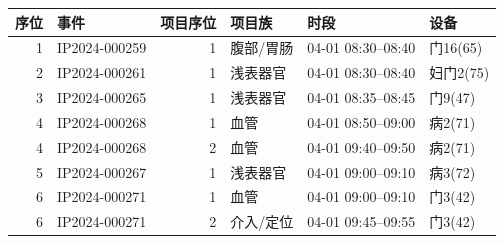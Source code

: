 \begin{tabularx}{\textwidth}{r l r X l l}
\toprule
序位 & 事件 & 项目序位 & 项目族 & 时段 & 设备 \\
\midrule
1 & IP2024-000259 & 1 & 腹部/胃肠 & 04-01 08:30--08:40 & 门16(65) \\
2 & IP2024-000261 & 1 & 浅表器官 & 04-01 08:30--08:40 & 妇门2(75) \\
3 & IP2024-000265 & 1 & 浅表器官 & 04-01 08:35--08:45 & 门9(47) \\
4 & IP2024-000268 & 1 & 血管 & 04-01 08:50--09:00 & 病2(71) \\
4 & IP2024-000268 & 2 & 血管 & 04-01 09:40--09:50 & 病2(71) \\
5 & IP2024-000267 & 1 & 浅表器官 & 04-01 09:00--09:10 & 病3(72) \\
6 & IP2024-000271 & 1 & 血管 & 04-01 09:00--09:10 & 门3(42) \\
6 & IP2024-000271 & 2 & 介入/定位 & 04-01 09:45--09:55 & 门3(42) \\
\bottomrule
\end{tabularx}

